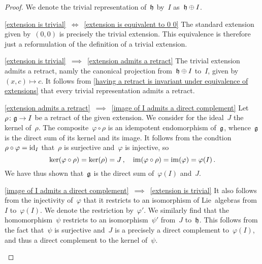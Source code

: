 \begin{proof}
  We denote the trivial representation of~$\mathfrak{h}$ by~$I$ as~$\mathfrak{h} \oplus I$.
  \begin{implicationlist}
    \item[\ref{extension is trivial}~$\iff$~\ref{extension is equivalent to 0 0}]
      The standard extension given by~$(0,0)$ is precisely the trivial extension.
      This equivalence is therefore just a reformulation of the definition of a trivial extension.
    \item[\ref{extension is trivial}~$\implies$~\ref{extension admits a retract}]
      The trivial extension admits a retract, namly the canonical projection from~$\mathfrak{h} \oplus I$ to~$I$, given by~$(x,c) \mapsto c$.
      It follows from \cref{having a retract is invariant under equivalence of extensions} that every trivial representation admits a retract.
    \item[\ref{extension admits a retract}~$\implies$~\ref{image of I admits a direct complement}]
      Let~$\rho \colon \glie \to I$ be a retract of the given extension.
      We consider for the ideal~$J$ the kernel of~$\rho$.
      The composite~$\varphi \circ \rho$ is an idempotent endomorphism of~$\mathfrak{g}$, whence~$\mathfrak{g}$ is the direct sum of its kernel and its image.
      It follows from the condtion~$\rho \circ \varphi = \mathrm{id}_I$ that~$\rho$ is surjective and~$\varphi$ is injective, so
      \[
        \ker(\varphi \circ \rho) = \ker(\rho) = J \,,
        \quad
        \operatorname{im}(\varphi \circ \rho) = \operatorname{im}(\varphi) = \varphi(I) \,.
      \]
      We have thus shown that~$\mathfrak{g}$ is the direct sum of~$\varphi(I)$ and~$J$.
    \item[\ref{image of I admits a direct complement}~$\implies$~\ref{extension is trivial}]
      It also follows from the injectivity of~$\varphi$ that it restricts to an isomorphism of Lie~algebras from~$I$ to~$\varphi(I)$.
      We denote the restriction by~$\varphi'$.
      We similarly find that the homomorphism~$\psi$ restricts to an isomorphism~$\psi'$ from~$J$ to~$\mathfrak{h}$.
      This follows from the fact that~$\psi$ is surjective and~$J$ is a precisely a direct complement to~$\varphi(I)$, and thus a direct complement to the kernel of~$\psi$.


\end{implicationlist}
\end{proof}
